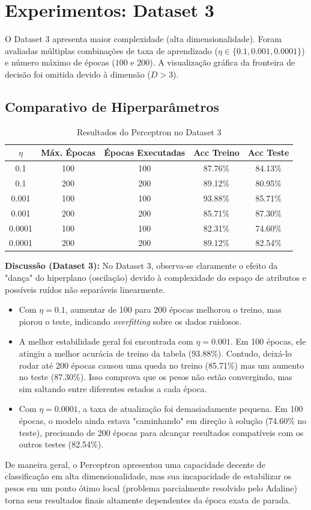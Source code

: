 \documentclass[12pt,a4paper]{article}
\begin{document}
\section{Experimentos: Dataset 3}
O Dataset 3 apresenta maior complexidade (alta dimensionalidade). Foram avaliadas múltiplas combinações de taxa de aprendizado ($\eta \in \{0.1, 0.001, 0.0001\}$) e número máximo de épocas ($100$ e $200$). A visualização gráfica da fronteira de decisão foi omitida devido à dimensão ($D > 3$).

\subsection{Comparativo de Hiperparâmetros}
\begin{table}[H]
\centering
\begin{tabular}{|c|c|c|c|c|}
\hline
\textbf{$\eta$} & \textbf{Máx. Épocas} & \textbf{Épocas Executadas} & \textbf{Acc Treino} & \textbf{Acc Teste} \\ \hline
0.1 & 100 & 100 & 87.76\% & 84.13\% \\ \hline
0.1 & 200 & 200 & 89.12\% & 80.95\% \\ \hline
0.001 & 100 & 100 & 93.88\% & 85.71\% \\ \hline
0.001 & 200 & 200 & 85.71\% & 87.30\% \\ \hline
0.0001 & 100 & 100 & 82.31\% & 74.60\% \\ \hline
0.0001 & 200 & 200 & 89.12\% & 82.54\% \\ \hline
\end{tabular}
\caption{Resultados do Perceptron no Dataset 3}
\end{table}

\textbf{Discussão (Dataset 3):} No Dataset 3, observa-se claramente o efeito da "dança" do hiperplano (oscilação) devido à complexidade do espaço de atributos e possíveis ruídos não separáveis linearmente. 
\begin{itemize}
    \item Com $\eta = 0.1$, aumentar de 100 para 200 épocas melhorou o treino, mas piorou o teste, indicando \textit{overfitting} sobre os dados ruidosos.
    \item A melhor estabilidade geral foi encontrada com $\eta = 0.001$. Em 100 épocas, ele atingiu a melhor acurácia de treino da tabela (93.88\%). Contudo, deixá-lo rodar até 200 épocas causou uma queda no treino (85.71\%) mas um aumento no teste (87.30\%). Isso comprova que os pesos não estão convergindo, mas sim saltando entre diferentes estados a cada época.
    \item Com $\eta = 0.0001$, a taxa de atualização foi demasiadamente pequena. Em 100 épocas, o modelo ainda estava "caminhando" em direção à solução (74.60\% no teste), precisando de 200 épocas para alcançar resultados compatíveis com os outros testes (82.54\%).
\end{itemize}
De maneira geral, o Perceptron apresentou uma capacidade decente de classificação em alta dimensionalidade, mas sua incapacidade de estabilizar os pesos em um ponto ótimo local (problema parcialmente resolvido pelo Adaline) torna seus resultados finais altamente dependentes da época exata de parada.
\end{document}
